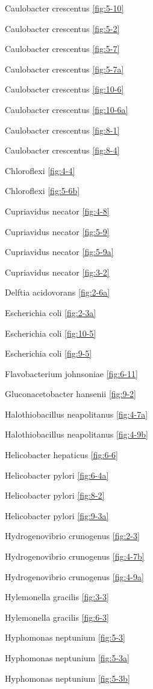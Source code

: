 \documentclass[]{tufte-book}
\begin{document}
Caulobacter crescentus \ref{fig:5-10}

Caulobacter crescentus \ref{fig:5-2}

Caulobacter crescentus \ref{fig:5-7}

Caulobacter crescentus \ref{fig:5-7a}

Caulobacter crescentus \ref{fig:10-6}

Caulobacter crescentus \ref{fig:10-6a}

Caulobacter crescentus \ref{fig:8-1}

Caulobacter crescentus \ref{fig:8-4}

Chloroflexi \ref{fig:4-4}

Chloroflexi \ref{fig:5-6b}

Cupriavidus necator \ref{fig:4-8}

Cupriavidus necator \ref{fig:5-9}

Cupriavidus necator \ref{fig:5-9a}

Cupriavidus necator \ref{fig:3-2}

Delftia acidovorans \ref{fig:2-6a}

Escherichia coli \ref{fig:2-3a}

Escherichia coli \ref{fig:10-5}

Escherichia coli \ref{fig:9-5}

Flavobacterium johnsoniae \ref{fig:6-11}

Gluconacetobacter hansenii \ref{fig:9-2}

Halothiobacillus neapolitanus \ref{fig:4-7a}

Halothiobacillus neapolitanus \ref{fig:4-9b}

Helicobacter hepaticus \ref{fig:6-6}

Helicobacter pylori \ref{fig:6-4a}

Helicobacter pylori \ref{fig:8-2}

Helicobacter pylori \ref{fig:9-3a}

Hydrogenovibrio crunogenus \ref{fig:2-3}

Hydrogenovibrio crunogenus \ref{fig:4-7b}

Hydrogenovibrio crunogenus \ref{fig:4-9a}

Hylemonella gracilis \ref{fig:3-3}

Hylemonella gracilis \ref{fig:6-3}

Hyphomonas neptunium \ref{fig:5-3}

Hyphomonas neptunium \ref{fig:5-3a}

Hyphomonas neptunium \ref{fig:5-3b}
\end{document}
